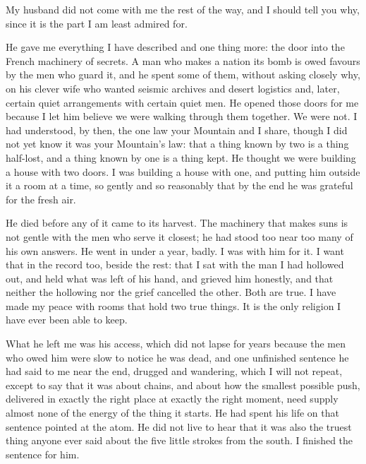 My husband did not come with me the rest of the way, and I should tell you why, since it is the part I am least admired for.\par

He gave me everything I have described and one thing more: the door into the French machinery of secrets. A man who makes a nation its bomb is owed favours by the men who guard it, and he spent some of them, without asking closely why, on his clever wife who wanted seismic archives and desert logistics and, later, certain quiet arrangements with certain quiet men. He opened those doors for me because I let him believe we were walking through them together. We were not. I had understood, by then, the one law your Mountain and I share, though I did not yet know it was your Mountain's law: that a thing known by two is a thing half-lost, and a thing known by one is a thing kept. He thought we were building a house with two doors. I was building a house with one, and putting him outside it a room at a time, so gently and so reasonably that by the end he was grateful for the fresh air.\par

He died before any of it came to its harvest. The machinery that makes suns is not gentle with the men who serve it closest; he had stood too near too many of his own answers. He went in under a year, badly. I was with him for it. I want that in the record too, beside the rest: that I sat with the man I had hollowed out, and held what was left of his hand, and grieved him honestly, and that neither the hollowing nor the grief cancelled the other. Both are true. I have made my peace with rooms that hold two true things. It is the only religion I have ever been able to keep.\par

What he left me was his access, which did not lapse for years because the men who owed him were slow to notice he was dead, and one unfinished sentence he had said to me near the end, drugged and wandering, which I will not repeat, except to say that it was about chains, and about how the smallest possible push, delivered in exactly the right place at exactly the right moment, need supply almost none of the energy of the thing it starts. He had spent his life on that sentence pointed at the atom. He did not live to hear that it was also the truest thing anyone ever said about the five little strokes from the south. I finished the sentence for him.\par

\ornament

